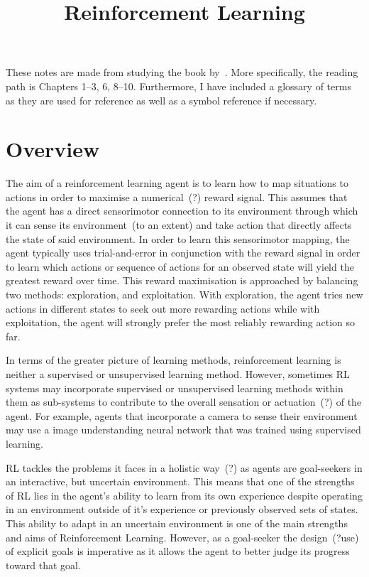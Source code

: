 \documentclass[12pt,notitlepage]{article}
\begin{document}
\title{Reinforcement Learning}
\author{}
\date{}
\maketitle


These notes are made from studying the book by~\cite{sutton2018reinforcement}.
More specifically, the reading path is Chapters 1--3, 6, 8--10. Furthermore, I
have included a glossary of terms as they are used for reference as well as a
symbol reference if necessary.

\section{Overview}

The aim of a reinforcement learning agent is to learn how to map situations to
actions in order to maximise a numerical~(?) reward signal. This assumes that
the agent has a direct sensorimotor connection to its environment through which
it can sense its environment~(to an extent) and take action that directly
affects the state of said environment. In order to learn this sensorimotor
mapping, the agent typically uses trial-and-error in conjunction with the
reward signal in order to learn which actions or sequence of actions for an
observed state will yield the greatest reward over time. This reward
maximisation is approached by balancing two methods: exploration, and
exploitation. With exploration, the agent tries new actions in different states
to seek out more rewarding actions while with exploitation, the agent will
strongly prefer the most reliably rewarding action so far.

In terms of the greater picture of learning methods, reinforcement learning is
neither a supervised or unsupervised learning method. However, sometimes RL
systems may incorporate supervised or unsupervised learning methods within them
as sub-systems to contribute to the overall sensation or actuation~(?) of the
agent. For example, agents that incorporate a camera to sense their environment
may use a image understanding neural network that was trained using supervised
learning. %

RL tackles the problems it faces in a holistic
way~(?) as agents are goal-seekers in an interactive, but uncertain
environment. This means that one of the strengths of RL lies in the agent's
ability to learn from its own experience despite operating in an environment
outside of it's experience or previously observed sets of states. This ability
to adapt in an uncertain environment is one of the main strengths and aims of
Reinforcement Learning. However, as a goal-seeker the design~(?use) of explicit
goals is imperative as it allows the agent to better judge its progress toward
that goal.
\end{document}
